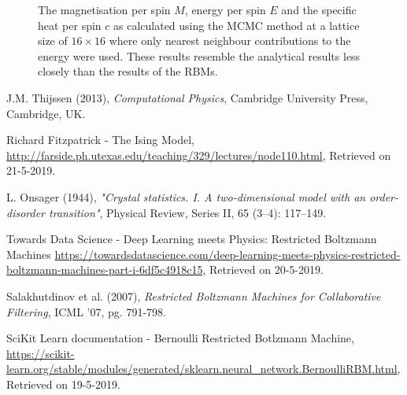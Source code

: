 \documentclass[10 pt, a4paper]{article}
\begin{document}
\begin{figure}[H]
\begin{subfigure}[b]{0.33\textwidth}
\end{subfigure}
\caption{The magnetisation per spin $M$, energy per spin $E$ and the specific heat per spin $c$ as calculated using the MCMC method at a lattice size of $16 \times 16$ where only nearest neighbour contributions to the energy were used. These results resemble the analytical results less closely than the results of the RBMs.}
  \label{fig:obsmcmc}
\end{figure}

\begin{thebibliography}{99}
J.M. Thijssen (2013), \textit{Computational Physics}, Cambridge University Press, Cambridge, UK.

Richard Fitzpatrick - The Ising Model, \url{http://farside.ph.utexas.edu/teaching/329/lectures/node110.html}, Retrieved on 21-5-2019.

L. Onsager (1944), \textit{"Crystal statistics. I. A two-dimensional model with an order-disorder transition"}, Physical Review, Series II, 65 (3–4): 117–149.

Towards Data Science - Deep Learning meets Physics: Restricted Boltzmann Machines \url{https://towardsdatascience.com/deep-learning-meets-physics-restricted-boltzmann-machines-part-i-6df5c4918c15}, Retrieved on 20-5-2019.

Salakhutdinov et al. (2007), \textit{Restricted Boltzmann Machines
for Collaborative Filtering}, ICML '07, pg. 791-798.

SciKit Learn documentation - Bernoulli Restricted Botlzmann Machine, \url{https://scikit-learn.org/stable/modules/generated/sklearn.neural_network.BernoulliRBM.html}, Retrieved on 19-5-2019.

\end{thebibliography}
\end{document}
